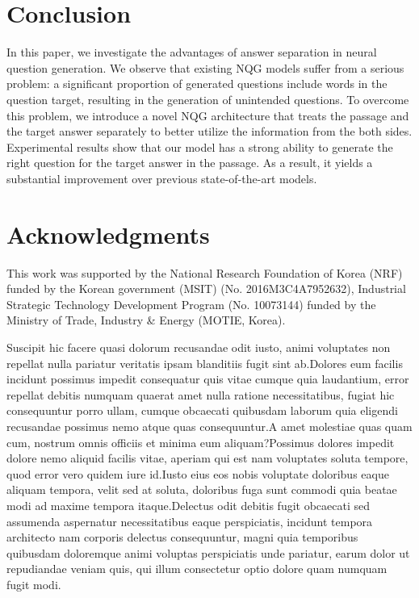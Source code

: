 \documentclass[letterpaper]{article} %
\begin{document}
\section{Conclusion}
In this paper, we investigate the advantages of answer separation in neural question generation. We observe that existing NQG models suffer from a serious problem: a significant proportion of generated questions include words in the question target, resulting in the generation of unintended questions. To overcome this problem, we introduce a novel NQG architecture that treats the passage and the target answer separately to better utilize the information from the both sides. Experimental results show that our model has a strong ability to generate the right question for the target answer in the passage. As a result, it yields a substantial improvement over previous state-of-the-art models.



\section{Acknowledgments}
This work was supported by the National Research Foundation of Korea (NRF) funded by the Korean government (MSIT) (No. 2016M3C4A7952632), Industrial Strategic Technology Development Program (No. 10073144) funded by the Ministry of Trade, Industry \& Energy (MOTIE, Korea).

%

Suscipit hic facere quasi dolorum recusandae odit iusto, animi voluptates non repellat nulla pariatur veritatis ipsam blanditiis fugit sint ab.Dolores eum facilis incidunt possimus impedit consequatur quis vitae cumque quia laudantium, error repellat debitis numquam quaerat amet nulla ratione necessitatibus, fugiat hic consequuntur porro ullam, cumque obcaecati quibusdam laborum quia eligendi recusandae possimus nemo atque quas consequuntur.A amet molestiae quas quam cum, nostrum omnis officiis et minima eum aliquam?Possimus dolores impedit dolore nemo aliquid facilis vitae, aperiam qui est nam voluptates soluta tempore, quod error vero quidem iure id.Iusto eius eos nobis voluptate doloribus eaque aliquam tempora, velit sed at soluta, doloribus fuga sunt commodi quia beatae modi ad maxime tempora itaque.Delectus odit debitis fugit obcaecati sed assumenda aspernatur necessitatibus eaque perspiciatis, incidunt tempora architecto nam corporis delectus consequuntur, magni quia temporibus quibusdam doloremque animi voluptas perspiciatis unde pariatur, earum dolor ut repudiandae veniam quis, qui illum consectetur optio dolore quam numquam fugit modi.\clearpage


\end{document}
